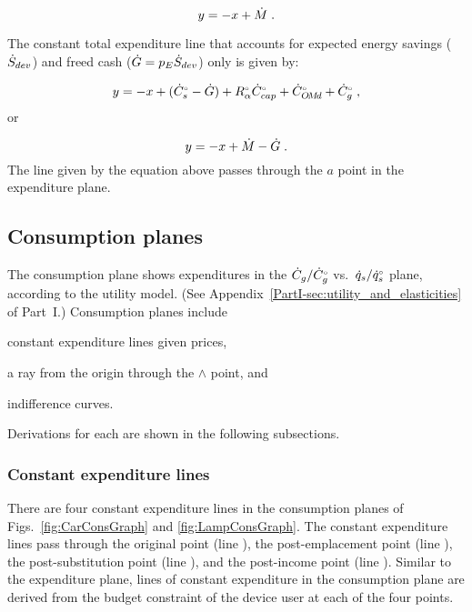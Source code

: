 \begin{equation}
  y = -x + \dot{M} \; .
\end{equation}

The constant total expenditure line 
that accounts for expected energy savings ($\dot{S}_{dev}$) 
and freed cash ($\dot{G} = p_E \dot{S}_{dev}$) only 
is given by:

\begin{equation}
  y = -x + ({}{\dot{C}}^{\scriptscriptstyle \circ}_s - \dot{G}) + {}{R}^{\scriptscriptstyle \circ}_\alpha {}{\dot{C}}^{\scriptscriptstyle \circ}_{cap} + {}{\dot{C}}^{\scriptscriptstyle \circ}_{O\!M\!d} + {}{\dot{C}}^{\scriptscriptstyle \circ}_g \; ,
\end{equation}
%
or

\begin{equation}
  y = -x + \dot{M} - \dot{G}\; .
\end{equation}
%
The line given by the equation above
passes through the $a$ point in the expenditure plane.


\subsection{Consumption planes}
\label{sec:cons_path_graph_details}

The consumption plane shows expenditures in 
the $\dot{C}_g/{}{\dot{C}}^{\scriptscriptstyle \circ}_g$ vs.\ $\dot{q}_s/{}{\dot{q}}^{\scriptscriptstyle \circ}_s$ plane,
according to the utility model.
(See Appendix~\ref{PartI-sec:utility_and_elasticities} of Part~I.)
Consumption planes include 
%
\begin{enumerate*}[label={(\roman*)}]
	
  \item constant expenditure lines given prices,
  
  \item a ray from the origin through the $\wedge$ point, and 
  
  \item indifference curves.
    
\end{enumerate*}
%
Derivations for each are shown in the following subsections.


\subsubsection{Constant expenditure lines} 
\label{sec:pref_graph_constant_expenditure_lines}

There are four constant expenditure lines in the consumption planes of
Figs.~\ref{fig:CarConsGraph} and \ref{fig:LampConsGraph}.
The constant expenditure lines pass through 
the original point (line \circcirc{}), 
the post-emplacement point (line \starstar{}), 
the post-substitution point (line \hathat{}), and 
the post-income point (line \barbar{}).
Similar to the expenditure plane, 
lines of constant expenditure in the consumption plane
are derived from the budget constraint of the device user
at each of the four points.

